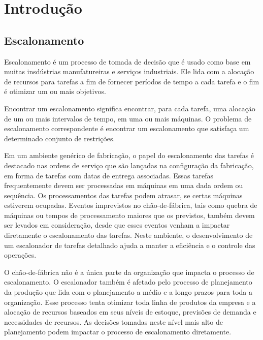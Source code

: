 \pagestyle{fancy}


\chapter{Introdução}\label{intro}

\section{Escalonamento}

Escalonamento é um processo de tomada de decisão que é usado como base em muitas insdústrias manufatureiras e serviços industriais. Ele lida com a alocação de recursos para tarefas a fim de fornecer períodos de tempo a cada tarefa  e o fim é otimizar um ou mais objetivos.

Encontrar um escalonamento significa encontrar, para cada tarefa, uma alocação de um ou mais intervalos de tempo, em uma ou mais máquinas. O problema de escalonamento correspondente é encontrar um escalonamento que satisfaça um determinado conjunto de restrições.

Em um ambiente genérico de fabricação, o papel do escalonamento das tarefas é 
destacado nas ordens de serviço que são lançadas na configuração da fabricação,
em forma de tarefas com datas de entrega associadas. Essas tarefas 
frequentemente devem ser processadas em máquinas em uma dada ordem ou 
sequência. Os processamentos das tarefas podem atrasar, se certas máquinas 
estiverem ocupadas. Eventos imprevistos no chão-de-fábrica, tais como quebra de 
máquinas ou tempos de processamento maiores que os previstos, também devem 
ser levados em consideração, desde que esses eventos venham a impactar 
diretamente o escalonamento das tarefas. Neste ambiente, o desenvolvimento de um escalonador de tarefas detalhado ajuda a manter a eficiência e o controle das 
operações. 

O chão-de-fábrica não é a única parte da organização que impacta o 
processo de escalonamento. O escalonador também é afetado pelo processo de 
planejamento da produção que lida com o planejamento a médio e a longo prazos 
para toda a organização. Esse processo tenta otimizar toda linha de produtos da 
empresa e a alocação de recursos baseados em seus níveis de estoque, previsões 
de demanda e necessidades de recursos. As decisões tomadas neste nível mais alto 
de planejamento podem impactar o processo de escalonamento diretamente. 

